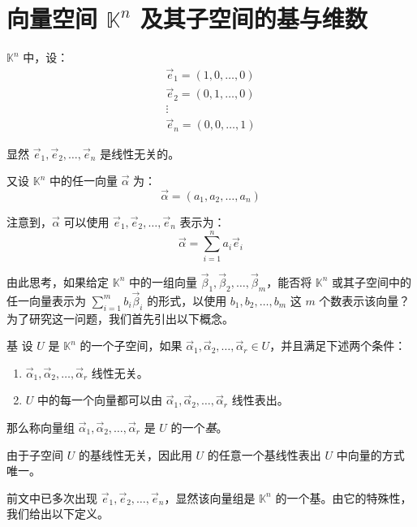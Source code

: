 
\section{向量空间 $\mathbb K^n$ 及其子空间的基与维数}

$\mathbb K^n$ 中，设：
$$
\begin{gathered}
	\vec e_1 = (1, 0, \ldots, 0)
	\\
	\vec e_2 = (0, 1, \ldots, 0)
	\\
	\vdots
	\\
	\vec e_n = (0, 0, \ldots, 1)
\end{gathered}
$$

显然 $\vec e_1, \vec e_2, \ldots, \vec e_n$ 是线性无关的。

又设 $\mathbb K^n$ 中的任一向量 $\vec \alpha$ 为：
$$
\vec \alpha = (a_1, a_2, \ldots, a_n)
$$

注意到，$\vec \alpha$ 可以使用 $\vec e_1, \vec e_2, \ldots, \vec e_n$ 表示为：
$$
\vec \alpha = \sum\limits_{i = 1}^n a_i \vec e_i
$$

由此思考，如果给定 $\mathbb K^n$ 中的一组向量 $\vec \beta_1, \vec \beta_2, \ldots, \vec \beta_m$，能否将 $\mathbb K^n$ 或其子空间中的任一向量表示为 $\sum\limits_{i = 1}^m b_i \vec \beta_i$ 的形式，以使用 $b_1, b_2, \ldots, b_m$ 这 $m$ 个数表示该向量？为了研究这一问题，我们首先引出以下概念。

\begin{definition}{基}
	设 $U$ 是 $\mathbb K^n$ 的一个子空间，如果 $\vec \alpha_1, \vec \alpha_2, \ldots, \vec \alpha_r \in U$，并且满足下述两个条件：
	\begin{enumerate}
		\item $\vec \alpha_1, \vec \alpha_2, \ldots, \vec \alpha_r$ 线性无关。
		\item $U$ 中的每一个向量都可以由 $\vec \alpha_1, \vec \alpha_2, \ldots, \vec \alpha_r$ 线性表出。
	\end{enumerate}

	那么称向量组 $\vec \alpha_1, \vec \alpha_2, \ldots, \vec \alpha_r$ 是 $U$ 的一个\emph{基}。
\end{definition}

由于子空间 $U$ 的基线性无关，因此用 $U$ 的任意一个基线性表出 $U$ 中向量的方式唯一。

前文中已多次出现 $\vec e_1, \vec e_2, \ldots, \vec e_n$，显然该向量组是 $\mathbb K^n$ 的一个基。由它的特殊性，我们给出以下定义。

